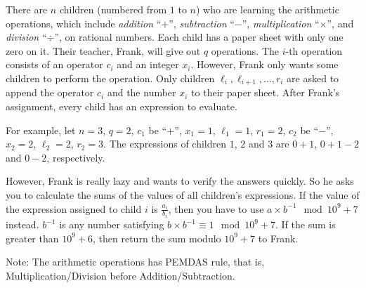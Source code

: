 There are $n$ children (numbered from $1$ to $n$) who are learning
the arithmetic operations, which include \emph{addition} ``$+$'', 
\emph{subtraction} ``$-$'', 
\emph{multiplication} ``$\times$'', and \emph{division} ``$\div$'', on 
rational numbers.
Each child has a paper sheet with only one zero on it. 
Their teacher, Frank, will give out $q$ operations. 
The $i$-th operation consists of an operator $c_i$ and an integer $x_i$.
However, Frank only wants some children to perform the operation.
Only children $\ell_i,\ell_{i+1},\dots,r_i$ are asked to append the 
operator $c_i$ and the number $x_i$ to their paper sheet.
After Frank's assignment, every child has an expression to evaluate.

For example, let $n=3$, $q=2$, $c_1$ be ``$+$'', $x_1=1$, $\ell_1=1$, $r_1=2$, 
$c_2$ be ``$-$'',  $x_2=2$, $\ell_2=2$, $r_2=3$. The expressions of children
$1$, $2$ and $3$ are $0+1$, $0+1-2$ and $0-2$, respectively.

However, Frank is really lazy and wants to verify the answers quickly. 
So he asks you to calculate the sums of the values of all children's 
expressions.
If the value of the expression assigned to child $i$ is $\frac{a_i}{b_i}$, 
then you have to use $a\times b^{-1}\mod 10^9+7$ instead. $b^{-1}$ is any number satisfying 
$b\times b^{-1}\equiv 1\mod 10^9+7$. 
If the sum is greater than $10^9+6$, then return the sum modulo $10^9+7$ to
Frank.

Note: The arithmetic operations has PEMDAS rule, that is, 
Multiplication/Division before Addition/Subtraction.
